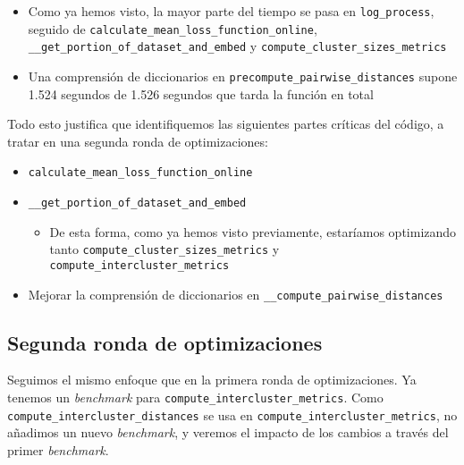 \begin{itemize}
    \item Como ya hemos visto, la mayor parte del tiempo se pasa en \lstinline{log_process}, seguido de \lstinline{calculate_mean_loss_function_online}, \lstinline{__get_portion_of_dataset_and_embed} y \lstinline{compute_cluster_sizes_metrics}
    \item Una comprensión de diccionarios en \lstinline{precompute_pairwise_distances} supone 1.524 segundos de 1.526 segundos que tarda la función en total
\end{itemize}

Todo esto justifica que identifiquemos las siguientes partes críticas del código, a tratar en una segunda ronda de optimizaciones:

\begin{itemize}
    \item \lstinline{calculate_mean_loss_function_online}
    \item \lstinline{__get_portion_of_dataset_and_embed}
        \begin{itemize}
            \item De esta forma, como ya hemos visto previamente, estaríamos optimizando tanto \lstinline{compute_cluster_sizes_metrics} y \lstinline{compute_intercluster_metrics}
        \end{itemize}
    \item Mejorar la comprensión de diccionarios en \lstinline{__compute_pairwise_distances}
\end{itemize}

\subsection{Segunda ronda de optimizaciones} \label{isubs:segunda_ronda_optimizaciones}

Seguimos el mismo enfoque que en la primera ronda de optimizaciones. Ya tenemos un \textit{benchmark} para \lstinline{compute_intercluster_metrics}. Como \lstinline{compute_intercluster_distances} se usa en \lstinline{compute_intercluster_metrics}, no añadimos un nuevo \textit{benchmark}, y veremos el impacto de los cambios a través del primer \textit{benchmark}.

